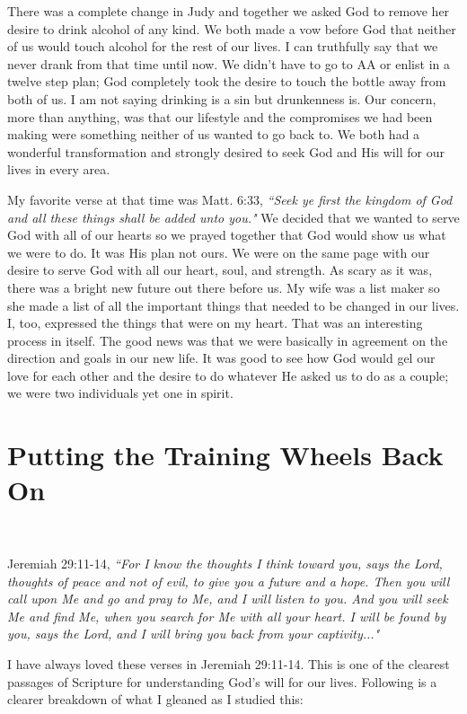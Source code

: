 \documentclass[oneside]{book}
\begin{document}
There was a complete change in Judy and together we asked God to remove her desire to drink alcohol of any kind. We both made a vow before God that neither of us would touch alcohol for the rest of our lives. I can truthfully say that we never drank from that time until now. We didn't have to go to AA or enlist in a twelve step plan; God completely took the desire to touch the bottle away from both of us. I am not saying drinking is a sin but drunkenness is. Our concern, more than anything, was that our lifestyle and the compromises we had been making were something neither of us wanted to go back to. We both had a wonderful transformation and strongly desired to seek God and His will for our lives in every area.

My favorite verse at that time was Matt. 6:33, \textit{``Seek ye first the kingdom of God and all these things shall be added unto you."} We decided that we wanted to serve God with all of our hearts so we prayed together that God would show us what we were to do. It was His plan not ours. We were on the same page with our desire to serve God with all our heart, soul, and strength. As scary as it was, there was a bright new future out there before us. My wife was a list maker so she made a list of all the important things that needed to be changed in our lives. I, too, expressed the things that were on my heart. That was an interesting process in itself. The good news was that we were basically in agreement on the direction and goals in our new life. It was good to see how God would gel our love for each other and the desire to do whatever He asked us to do as a couple; we were two individuals yet one in spirit.


\section{Putting the Training Wheels Back On}
\

Jeremiah 29:11-14, \textit{``For I know the thoughts I think toward you, says the Lord, thoughts of peace and not of evil, to give you a future and a hope. Then you will call upon Me and go and pray to Me, and I will listen to you. And you will seek Me and find Me, when you search for Me with all your heart. I will be found by you, says the Lord, and I will bring you back from your captivity..."}

I have always loved these verses in Jeremiah 29:11-14. This is one of the clearest passages of Scripture for understanding God's will for our lives. Following is a clearer breakdown of what I gleaned as I studied this:
	
\end{document}
